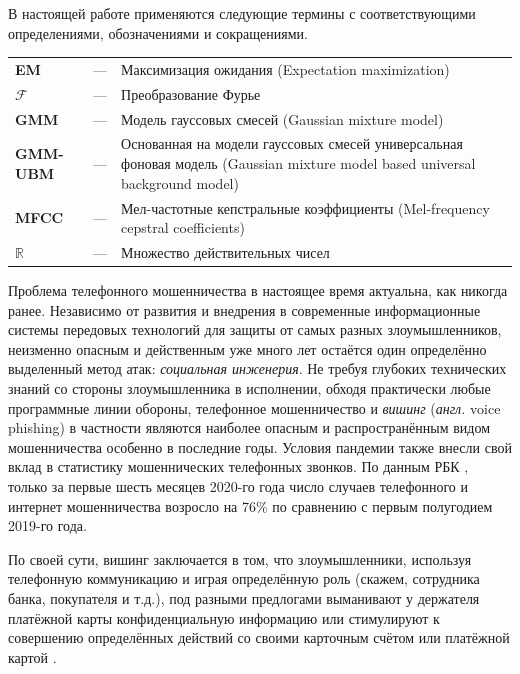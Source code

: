 \documentclass{gost-7-32}
\begin{document}
\newpage
\tableofcontents

\newpage
\abbreviations

В настоящей работе применяются следующие термины с соответствующими определениями, обозначениями и сокращениями.

\vspace{1.0cm}

\begin{tabularx}{0.9 \textwidth}{
    >{\raggedright \arraybackslash \hsize=0.2\hsize}X
    >{\centering \arraybackslash \hsize=0.1\hsize}X
    >{\raggedright \arraybackslash \hsize=0.7\hsize}X
}
    \bf{EM} &---& Максимизация ожидания (Expectation maximization) \\
    $\mathcal{F}$ &---& Преобразование Фурье \\
    \bf{GMM} &---& Модель гауссовых смесей (Gaussian mixture model) \\
    \bf{GMM-UBM} &---& Основанная на модели гауссовых смесей универсальная фоновая модель (Gaussian mixture model based universal background model) \\
    \bf{MFCC} &---& Мел-частотные кепстральные коэффициенты (Mel-frequency cepstral coefficients) \\
    $\mathbb{R}$ &---& Множество действительных чисел \\
\end{tabularx}

\newpage
\introduction

Проблема телефонного мошенничества в настоящее время актуальна, как никогда ранее.
Независимо от развития и внедрения в современные информационные системы передовых технологий для защиты от самых разных злоумышленников, неизменно опасным и действенным уже много лет остаётся один определённо выделенный метод атак: \textit{социальная инженерия}.
Не требуя глубоких технических знаний со стороны злоумышленника в исполнении, обходя практически любые программные линии обороны, телефонное мошенничество и \textit{вишинг} (\textit{англ.} voice phishing) в частности являются наиболее опасным и распространённым видом мошенничества особенно в последние годы.
Условия пандемии также внесли свой вклад в статистику мошеннических телефонных звонков.
По данным РБК \cite{rbk}, только за первые шесть месяцев 2020-го года число случаев телефонного и интернет мошенничества возросло на 76\% по сравнению с первым полугодием 2019-го года.

По своей сути, вишинг заключается в том, что злоумышленники, используя телефонную коммуникацию и играя определённую роль (скажем, сотрудника банка, покупателя и т.д.), под разными предлогами выманивают у держателя платёжной карты конфиденциальную информацию или стимулируют к совершению определённых действий со своими карточным счётом или платёжной картой \cite{york_vishing, fishing_book}.
\end{document}
